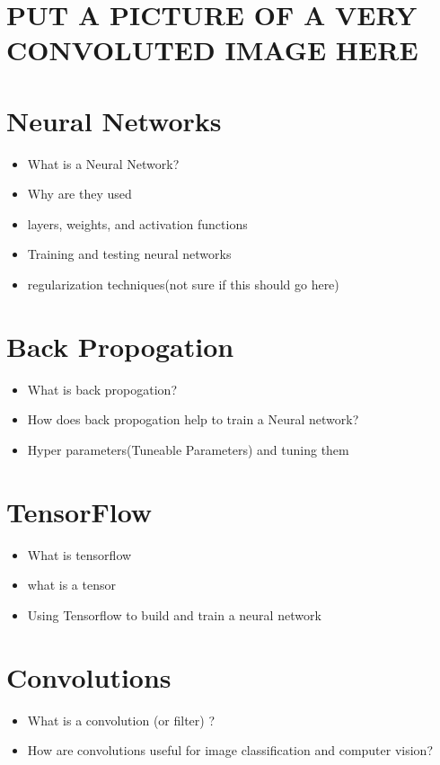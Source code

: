 \documentclass[12pt]{article} %
\begin{document}
 \section{PUT A PICTURE OF A  VERY CONVOLUTED IMAGE HERE }


\section{Neural Networks}
\begin{itemize}
\item What is a Neural Network?
\item Why are they used
\item layers, weights, and activation functions
\item Training and testing neural networks 
\item regularization techniques(not sure if this should go here)
\end{itemize}


\section{Back Propogation}
\begin{itemize}
\item What is back propogation?
\item How does back propogation help to train a Neural network?
\item Hyper parameters(Tuneable Parameters) and tuning them
\end{itemize}

\section{TensorFlow}
\begin{itemize}
\item What is tensorflow
\item what is a tensor
\item Using Tensorflow to build and train a neural network
\end{itemize}


\section{Convolutions}
\begin{itemize}
\item What is a convolution (or filter) ?
\item How are convolutions useful for image classification and computer vision?
\end{itemize}
\end{document}

